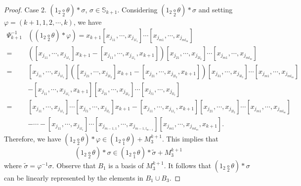 \documentclass{amsart}
\theoremstyle{definition}
\theoremstyle{remark}
\numberwithin{equation}{section}
\def\S{\mathbb{S}}
\newcommand{\ucr}[1]{\underset{#1}{\circ}}
\def \S{\mathbb{S}}
\begin{document}
\begin{proof}
Case 2. $(1_2\ucr{2} \theta)\ast \sigma$, $\sigma\in \S_{k+1}$. 
Considering $(1_2\ucr{2} \theta)\ast \sigma$ and setting  
$\varphi=(k+1,1,2,\cdots,k)$, we have
\begin{align*}
\Psi_{k+1}^{-1}&((1_2\ucr{2} \theta)\ast\varphi)
 = x_{k+1}[x_{j_{11}}, 
\cdots, x_{j_{1l_1}}]\cdots[x_{j_{m1}}, \cdots, x_{j_{ml_m}}]\\
=& ([x_{j_{11}}, \cdots, x_{j_{1l_1}}]x_{k+1}-[x_{j_{11}}, 
 \cdots, x_{j_{1l_1}}, x_{k+1}])[x_{j_{21}}, 
 \cdots, x_{j_{2l_2}}]\cdots[x_{j_{m1}}, \cdots, x_{j_{ml_m}}]\\
=& [x_{j_{11}}, \cdots, x_{j_{1l_1}}]([x_{j_{21}}, 
 \cdots, x_{j_{2l_2}}]x_{k+1}-[x_{j_{21}}, \cdots, x_{j_{2l_2}}, 
 x_{k+1}])[x_{j_{31}}, \cdots, x_{j_{3l_3}}]\cdots[x_{j_{m1}}, 
 \cdots, x_{j_{ml_m}}]\\
& -[x_{j_{11}}, \cdots, x_{j_{1l_1}}, x_{k+1}][x_{j_{21}}, 
 \cdots, x_{j_{2l_2}}]\cdots[x_{j_{t1}}, \cdots, x_{j_{tl_t}}]\\
=& [x_{j_{11}}, \cdots, x_{j_{1l_1}}]\cdots[x_{j_{t1}}, 
 \cdots, x_{j_{tl_t}}]x_{k+1}-[x_{j_{11}}, \cdots, 
 x_{j_{1l_1}}, x_{k+1}][x_{j_{21}}, \cdots, x_{j_{2l_2}}]
 \cdots[x_{j_{m1}}, \cdots, x_{j_{ml_m}}]\\
& -\cdots-[x_{j_{11}}, \cdots, x_{j_{1l_1}}]\cdots
 [x_{j_{m-1,1}}, \cdots, x_{j_{m-1,l_{m-1}}}]
 [x_{j_{m1}}, \cdots, x_{j_{ml_m}}, x_{k+1}].
\end{align*}
Therefore,  we have $(1_2\ucr{2} \theta)\ast
\varphi\in (1_2\ucr{1}\theta)+M^{k+1}_3$. This implies that 
\[(1_2\ucr{2} \theta)\ast \sigma \in 
(1_2\ucr{1}\theta)\ast \widetilde{\sigma}+M^{k+1}_3\]
where $\widetilde{\sigma}=\varphi^{-1}\sigma$.
Observe that $B_1$ is a basis of $M^{k+1}_3$. It follows 
that $(1_2\ucr{2} \theta)\ast \sigma$ can be linearly 
represented by the elements in $B_1\cup B_3$.



\end{proof}
\end{document}
